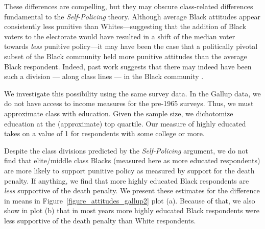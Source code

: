 \documentclass[12pt]{article}
\begin{document}
These differences are compelling, but they may obscure class-related differences fundamental to the \emph{Self-Policing} theory.  Although average Black attitudes appear consistently less punitive than Whites---suggesting that the addition of Black voters to the electorate would have resulted in a shift of the median voter towards \emph{less} punitive policy---it may have been the case that a politically pivotal subset of the Black community held more punitive attitudes than the average Black respondent.  Indeed, past work suggests that there may indeed have been such a division --- along class lines --- in the Black community .

We investigate this possibility using the same survey data.  In the Gallup data, we do not have access to income measures for the pre-1965 surveys.  Thus, we must approximate class with education.  Given the sample size, we dichotomize education at the (approximate) top quartile.  Our measure of highly educated takes on a value of 1 for respondents with some college or more.

Despite the class divisions predicted by the \emph{Self-Policing} argument, we do not find that elite/middle class Blacks (measured here as more educated respondents) are more likely to support punitive policy as measured by support for the death penalty.  If anything, we find that more highly educated Black respondents are \emph{less} supportive of the death penalty.  We present these estimates for the difference in means in Figure~\ref{figure_attitudes_gallup2} plot (a).  Because of that, we also show in plot (b) that in most years more highly educated Black respondents were less supportive of the death penalty than White respondents.
\end{document}
